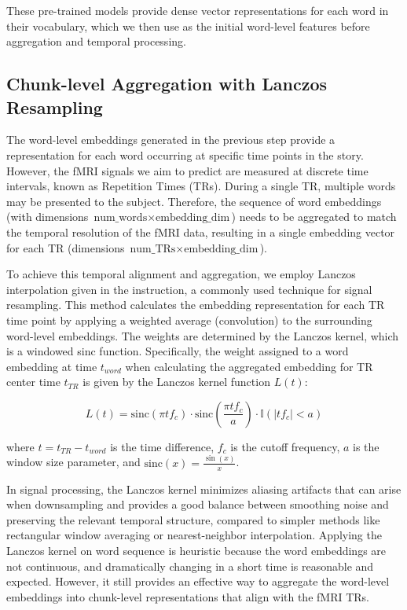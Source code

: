 \documentclass[10pt,letterpaper]{article}
\begin{document}
These pre-trained models provide dense vector representations for each word in their vocabulary, which we then use as the initial word-level features before aggregation and temporal processing.

\subsection{Chunk-level Aggregation with Lanczos Resampling}

The word-level embeddings generated in the previous step provide a representation for each word occurring at specific time points in the story. However, the fMRI signals we aim to predict are measured at discrete time intervals, known as Repetition Times (TRs). During a single TR, multiple words may be presented to the subject. Therefore, the sequence of word embeddings (with dimensions \(\text{num\_words} \times \text{embedding\_dim}\)) needs to be aggregated to match the temporal resolution of the fMRI data, resulting in a single embedding vector for each TR (dimensions \(\text{num\_TRs} \times \text{embedding\_dim}\)).

To achieve this temporal alignment and aggregation, we employ Lanczos interpolation given in the instruction, a commonly used technique for signal resampling. This method calculates the embedding representation for each TR time point by applying a weighted average (convolution) to the surrounding word-level embeddings. The weights are determined by the Lanczos kernel, which is a windowed sinc function. Specifically, the weight assigned to a word embedding at time \(t_{word}\) when calculating the aggregated embedding for TR center time 
\(t_{TR}\) is given by the Lanczos kernel function \(L(t)\):

\[
L(t) = \text{sinc}(\pi t f_c) \cdot \text{sinc}(\frac{\pi t f_c}{a}) \cdot \mathbb{I}(|t f_c| < a)
\]

where \(t = t_{TR} - t_{word}\) is the time difference, $f_c$ is the cutoff frequency, $a$ is the window size parameter, and \(\text{sinc}(x) = \frac{\sin(x)}{x}\).

In signal processing, the Lanczos kernel minimizes aliasing artifacts that can arise when downsampling and provides a good balance between smoothing noise and preserving the relevant temporal structure, compared to simpler methods like rectangular window averaging or nearest-neighbor interpolation. Applying the Lanczos kernel on word sequence is heuristic because the word embeddings are not continuous, and dramatically changing in a short time is reasonable and expected. However, it still provides an effective way to aggregate the word-level embeddings into chunk-level representations that align with the fMRI TRs.
\end{document}
